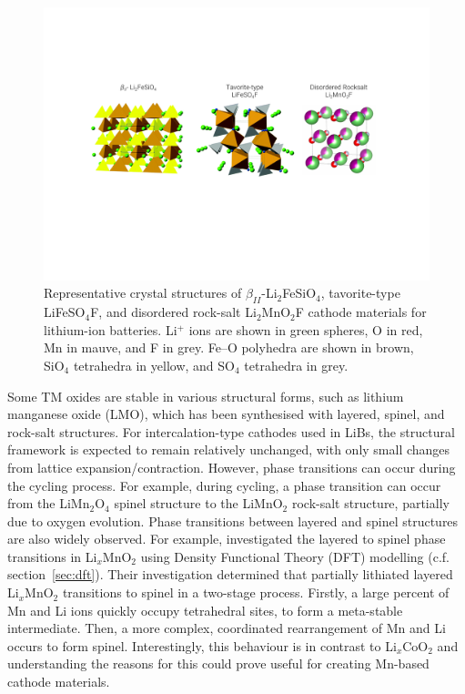 \documentclass[../main.tex]{subfiles}
\begin{document}
\begin{figure}
    \centering
    \includegraphics[scale=0.7]{figures/cathode_structures_others.pdf}
    \caption{Representative crystal structures of $\beta_{II}$-Li$_2$FeSiO$_4$, tavorite-type LiFeSO$_4$F, and disordered rock-salt Li$_2$MnO$_2$F cathode materials for lithium-ion batteries. Li$^+$ ions are shown in green spheres, O in red, Mn in mauve, and F in grey. Fe–O polyhedra are shown in brown, SiO$_4$ tetrahedra in yellow, and SO$_4$ tetrahedra in grey.}
    \label{fig:cathode_structures}
\end{figure}

Some TM oxides are stable in various structural forms, such as lithium manganese oxide (LMO), which has been synthesised with layered, \cite{armstrong1996synthesis} spinel, \cite{mosbah1983phases} and rock-salt structures. \cite{dittrich1969kristallstruktur} For intercalation-type cathodes used in LiBs, the structural framework is expected to remain relatively unchanged, with only small changes from lattice expansion/contraction. However, phase transitions can occur during the cycling process. For example, during cycling, a phase transition can occur from the LiMn$_2$O$_4$ spinel structure to the LiMnO$_2$ rock-salt structure, partially due to oxygen evolution. \cite{peng2017atomistic} Phase transitions between layered and spinel structures are also widely observed. \cite{chen2018understanding} For example, \citeauthor{reed2001layered} investigated the layered to spinel phase transitions in Li$_x$MnO$_2$ using Density Functional Theory (DFT) modelling (c.f. section~\ref{sec:dft}).\cite{reed2001layered} Their investigation determined that partially lithiated layered Li$_x$MnO$_2$ transitions to spinel in a two-stage process. Firstly, a large percent of Mn and Li ions quickly occupy tetrahedral sites, to form a meta-stable intermediate. Then, a more complex, coordinated rearrangement of Mn and Li occurs to form spinel. Interestingly, this behaviour is in contrast to Li$_x$CoO$_2$ and understanding the reasons for this could prove useful for creating Mn-based cathode materials.
\end{document}
